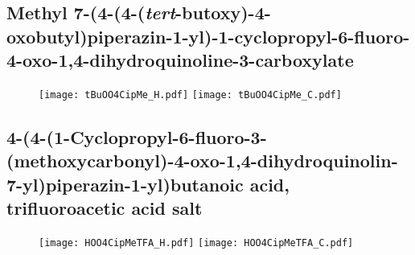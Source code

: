 \subsection{Methyl 7\hyp{}(4\hyp{}(4\hyp{}(\textit{tert}\hyp{}butoxy)\hyp{}4\hyp{}oxobutyl)piperazin\hyp{}1\hyp{}yl)\hyp{}1\hyp{}cyclopropyl\hyp{}6\hyp{}fluoro\hyp{}4\hyp{}oxo\hyp{}1,4\hyp{}dihydroquinoline\hyp{}3\hyp{}carboxylate }

\begin{figure}[H]
	\centering
		\texttt{[image: tBuOO4CipMe\_H.pdf]}
		\texttt{[image: tBuOO4CipMe\_C.pdf]}
\end{figure}

\subsection{4\hyp{}(4\hyp{}(1\hyp{}Cyclopropyl\hyp{}6\hyp{}fluoro\hyp{}3\hyp{}(methoxycarbonyl)\hyp{}4\hyp{}oxo\hyp{}1,4\hyp{}dihydroquinolin\hyp{}7\hyp{}yl)piperazin\hyp{}1\hyp{}yl)bu\allowbreak tanoic acid, trifluoroacetic acid salt }

\begin{figure}[H]
	\centering
		\texttt{[image: HOO4CipMeTFA\_H.pdf]}
		\texttt{[image: HOO4CipMeTFA\_C.pdf]}
\end{figure}









%


